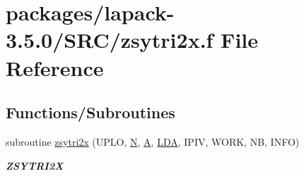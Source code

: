\hypertarget{zsytri2x_8f}{}\section{packages/lapack-\/3.5.0/\+S\+R\+C/zsytri2x.f File Reference}
\label{zsytri2x_8f}
\subsection*{Functions/\+Subroutines}
\begin{DoxyCompactItemize}
\item 
subroutine \hyperlink{group__complex16SYcomputational_ga837c4d6af7bad75b55b2b6ab56d78eb2}{zsytri2x} (U\+P\+L\+O, \hyperlink{polmisc_8c_a0240ac851181b84ac374872dc5434ee4}{N}, \hyperlink{classA}{A}, \hyperlink{example__user_8c_ae946da542ce0db94dced19b2ecefd1aa}{L\+D\+A}, I\+P\+I\+V, W\+O\+R\+K, N\+B, I\+N\+F\+O)
\begin{DoxyCompactList}\small\item\em {\bfseries Z\+S\+Y\+T\+R\+I2\+X} \end{DoxyCompactList}\end{DoxyCompactItemize}
